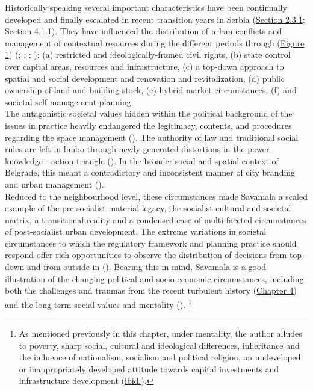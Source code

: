 \documentclass[11pt]{report}
\begin{document}
{{{{Historically speaking several important characteristics have been continually developed and finally escalated in recent transition years in Serbia (\href{Section 2.3.1}{Section 2.3.1}; \href{Section 4.1.1}{Section 4.1.1}). They have influenced the distribution of urban conflicts and management of contextual resources during the different periods through (\href{Figure 1}{Figure 1}) (\href{ref}{\citealt{simmie_self-management_1989}}; \href{ref}{\citealt{vujovic_belgrades_2007}}; \href{ref}{\citealt{petrovic_cities_2009}}; \href{ref}{\citealt{vujosevic_postsocijalisticka_2010}}): 
(a) restricted and ideologically-framed civil rights, 
(b) state control over capital areas, resources and infrastructure,
(c) a top-down approach to spatial and social development and renovation and revitalization,
(d) public ownership of land and building stock,
(e) hybrid market circumstances,
(f) and societal self-management planning
\\

The antagonistic societal values hidden within the political background of the issues in practice heavily endangered the legitimacy, contents, and procedures regarding the space management (\href{ref}{\citealt{vujosevic_planning_2006}}).
The authority of law and traditional social rules are left in limbo through newly generated distortions in the power - knowledge - action triangle (\href{ref}{\citealt{friedmann_planning_1987}}).
In the broader social and spatial context of Belgrade, this meant a contradictory and inconsistent manner of city branding and urban management
(\href{ref}{\citealt{doytchinov_belgrade:_2015}}).
\\

Reduced to the neighbourhood level, these circumstances made Savamala a scaled example of the pre-socialist material legacy, the socialist cultural and societal matrix, a transitional reality and a condensed case of multi-faceted circumstances of post-socialist urban development.
The extreme variations in societal circumstances to which the regulatory framework and planning practice should respond offer rich opportunities to observe the distribution of decisions from top-down and from outside-in (\href{Peric}{\citealt{peric_evolution_2016}}).
Bearing this in mind, Savamala is a good illustration of the changing political and socio-economic circumstances, including both the challenges and traumas from the recent turbulent history (\href{Chapter 4}{Chapter 4}) and the long term social values and mentality (\href{ref}{\citealt{doytchinov_belgrade_2015}}).
\footnote{As mentioned previously in this chapter, under mentality, the author alludes to poverty, sharp social, cultural and ideological differences, inheritance and the influence of nationalism, socialism and political religion, an undeveloped or inappropriately developed attitude towards capital investments and infrastructure development  (\href{Samardzic}{ibid.}).}
\\

}}}}
\end{document}
